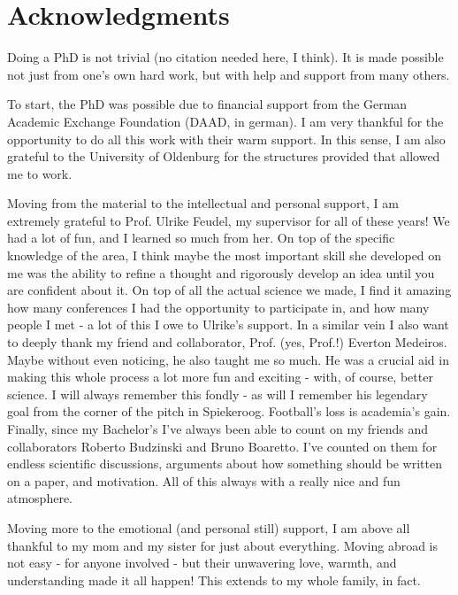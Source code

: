 \chapter*{Acknowledgments}

Doing a PhD is not trivial (no citation needed here, I think). It is made possible not just from one's own hard work, but with help and support from many others. 

To start, the PhD was possible due to financial support from the German Academic Exchange Foundation (DAAD, in german). I am very thankful for the opportunity to do all this work with their warm support. In this sense, I am also grateful to the University of Oldenburg for the structures provided that allowed me to work. 

Moving from the material to the intellectual and personal support, I am extremely grateful to Prof. Ulrike Feudel, my supervisor for all of these years! We had a lot of fun, and I learned so much from her. On top of the specific knowledge of the area, I think maybe the most important skill she developed on me was the ability to refine a thought and rigorously develop an idea until you are confident about it. On top of all the actual science we made, I find it amazing how many conferences I had the opportunity to participate in, and how many people I met - a lot of this I owe to Ulrike's support. In a similar vein I also want to deeply thank my friend and collaborator, Prof. (yes, Prof.!) Everton Medeiros. Maybe without even noticing, he also taught me so much. He was a crucial aid in making this whole process a lot more fun and exciting - with, of course, better science. I will always remember this fondly - as will I remember his legendary goal from the corner of the pitch in Spiekeroog. Football's loss is academia's gain. Finally, since my Bachelor's I've always been able to count on my friends and collaborators Roberto Budzinski and Bruno Boaretto. I've counted on them for endless scientific discussions, arguments about how something should be written on a paper, and motivation. All of this always with a really nice and fun atmosphere.      

Moving more to the emotional (and personal still) support, I am above all thankful to my mom and my sister for just about everything. Moving abroad is not easy - for anyone involved - but their unwavering love, warmth, and understanding made it all happen! This extends to my whole family, in fact. 

